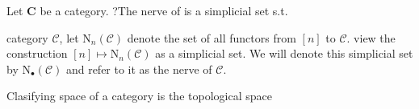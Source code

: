\begin{definition}
    Let \(\mathbf{C}\) be a category. ?The nerve of is a simplicial set s.t.

    category \(\mathcal{C}\),  let \(\mathrm{N}_n(\mathcal{C})\) denote the set of all functors from \([n]\) to \(\mathcal{C}\). view the construction \([n] \mapsto \mathrm{N}_n(\mathcal{C})\) as a simplicial set. We will denote this simplicial set by \(\mathrm{N}_{\bullet}(\mathcal{C})\) and refer to it as the nerve of \(\mathcal{C}\).
\end{definition}



Clasifying space of a category is the topological space











